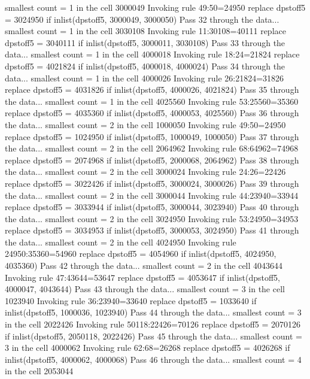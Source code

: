   smallest count = 1 in the cell      3000049
  Invoking rule 49:50=24950
  replace dpstoff5 = 3024950 if inlist(dpstoff5, 3000049, 3000050)
Pass 32 through the data...
  smallest count = 1 in the cell      3030108
  Invoking rule 11:30108=40111
  replace dpstoff5 = 3040111 if inlist(dpstoff5, 3000011, 3030108)
Pass 33 through the data...
  smallest count = 1 in the cell      4000018
  Invoking rule 18:24=21824
  replace dpstoff5 = 4021824 if inlist(dpstoff5, 4000018, 4000024)
Pass 34 through the data...
  smallest count = 1 in the cell      4000026
  Invoking rule 26:21824=31826
  replace dpstoff5 = 4031826 if inlist(dpstoff5, 4000026, 4021824)
Pass 35 through the data...
  smallest count = 1 in the cell      4025560
  Invoking rule 53:25560=35360
  replace dpstoff5 = 4035360 if inlist(dpstoff5, 4000053, 4025560)
Pass 36 through the data...
  smallest count = 2 in the cell      1000050
  Invoking rule 49:50=24950
  replace dpstoff5 = 1024950 if inlist(dpstoff5, 1000049, 1000050)
Pass 37 through the data...
  smallest count = 2 in the cell      2064962
  Invoking rule 68:64962=74968
  replace dpstoff5 = 2074968 if inlist(dpstoff5, 2000068, 2064962)
Pass 38 through the data...
  smallest count = 2 in the cell      3000024
  Invoking rule 24:26=22426
  replace dpstoff5 = 3022426 if inlist(dpstoff5, 3000024, 3000026)
Pass 39 through the data...
  smallest count = 2 in the cell      3000044
  Invoking rule 44:23940=33944
  replace dpstoff5 = 3033944 if inlist(dpstoff5, 3000044, 3023940)
Pass 40 through the data...
  smallest count = 2 in the cell      3024950
  Invoking rule 53:24950=34953
  replace dpstoff5 = 3034953 if inlist(dpstoff5, 3000053, 3024950)
Pass 41 through the data...
  smallest count = 2 in the cell      4024950
  Invoking rule 24950:35360=54960
  replace dpstoff5 = 4054960 if inlist(dpstoff5, 4024950, 4035360)
Pass 42 through the data...
  smallest count = 2 in the cell      4043644
  Invoking rule 47:43644=53647
  replace dpstoff5 = 4053647 if inlist(dpstoff5, 4000047, 4043644)
Pass 43 through the data...
  smallest count = 3 in the cell      1023940
  Invoking rule 36:23940=33640
  replace dpstoff5 = 1033640 if inlist(dpstoff5, 1000036, 1023940)
Pass 44 through the data...
  smallest count = 3 in the cell      2022426
  Invoking rule 50118:22426=70126
  replace dpstoff5 = 2070126 if inlist(dpstoff5, 2050118, 2022426)
Pass 45 through the data...
  smallest count = 3 in the cell      4000062
  Invoking rule 62:68=26268
  replace dpstoff5 = 4026268 if inlist(dpstoff5, 4000062, 4000068)
Pass 46 through the data...
  smallest count = 4 in the cell      2053044
